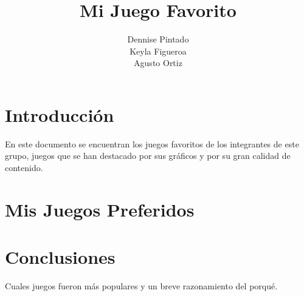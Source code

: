 \documentclass[12pt,oneside]{book}
\title{Mi Juego Favorito}
\author{Dennise Pintado \\ Keyla Figueroa \\ Agusto Ortiz}
\begin{document}
\maketitle
\tableofcontents

\chapter{Introducción}
En este documento se encuentran los juegos favoritos de los integrantes de este grupo, juegos que se han destacado por sus gráficos y por su gran calidad de contenido.

\chapter{Mis Juegos Preferidos}



\chapter{Conclusiones}
Cuales juegos fueron más populares y un breve razonamiento del porqué.
\end{document}
